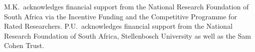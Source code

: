 \documentclass[epjST,numbook]{svjour}
\begin{document}
%
\begin{acknowledgement}
M.K.\ acknowledges financial support from the National Research Foundation of South Africa via the Incentive Funding and the Competitive Programme for Rated Researchers. P.U.\ acknowledges financial support from the National Research Foundation of South Africa, Stellenbosch University as well as the Sam Cohen Trust.

\end{acknowledgement}
%
\end{document}
